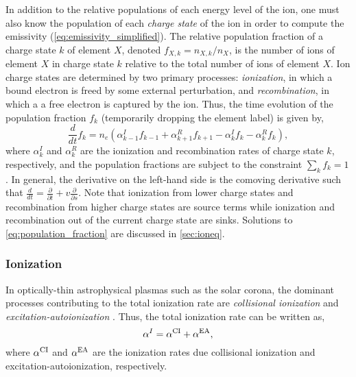 In addition to the relative populations of each energy level of the ion, one must also know the population of each \textit{charge state} of the ion in order to compute the emissivity (\autoref{eq:emissivity_simplified}). The relative population fraction of a charge state $k$ of element $X$, denoted $f_{X,k}=n_{X,k}/n_X$, is the number of ions of element $X$ in charge state $k$ relative to the total number of ions of element $X$. Ion charge states are determined by two primary processes: \textit{ionization}, in which a bound electron is freed by some external perturbation, and \textit{recombination}, in which a a free electron is captured by the ion. Thus, the time evolution of the population fraction $f_k$ (temporarily dropping the element label) is given by,
\begin{equation}\label{eq:population_fraction}
    \frac{d}{dt}f_k = n_e(\alpha_{k-1}^I f_{k-1} + \alpha_{k+1}^R f_{k+1} - \alpha_{k}^I f_k - \alpha_k^R f_k),
\end{equation}
where $\alpha_k^I$ and $\alpha_k^R$ are the ionization and recombination rates of charge state $k$, respectively, and the population fractions are subject to the constraint $\sum_kf_k=1$ \citep{del_zanna_solar_2018}. In general, the derivative on the left-hand side is the comoving derivative such that $\frac{d}{dt}=\frac{\partial}{\partial t} + v\frac{\partial}{\partial s}$. Note that ionization from lower charge states and recombination from higher charge states are source terms while ionization and recombination out of the current charge state are sinks. Solutions to \autoref{eq:population_fraction} are discussed in \autoref{sec:ioneq}.

\subsubsection{Ionization}

In optically-thin astrophysical plasmas such as the solar corona, the dominant processes contributing to the total ionization rate are \textit{collisional ionization} and \textit{excitation-autoionization} \citep{bradshaw_collisional_2013}. Thus, the total ionization rate can be written as,
\begin{equation}\label{eq:total_ionization_rate}
    \alpha^I = \alpha^\textup{CI} + \alpha^\textup{EA},
\end{equation}
where $\alpha^\textup{CI}$ and $\alpha^\textup{EA}$ are the ionization rates due collisional ionization and excitation-autoionization, respectively. 

